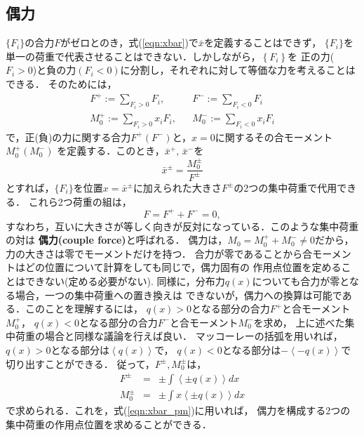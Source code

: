 \documentclass[10pt,a4j]{jbook}
\begin{document}
\subsection{偶力}
$\{F_i\}$の合力$F$がゼロとのき，式(\ref{eqn:xbar})で$\bar x$を定義することはできず，
$\{F_i\}$を単一の荷重で代表させることはできない．しかしながら，$\left\{ F_i \right\}$を
正の力($F_i >0$)と負の力$(F_i<0)$に分割し，それぞれに対して等価な力を考えることはできる．
そのためには，
\begin{eqnarray}
	F^+ := \sum _{ F_i > 0 } F_i, & & F^- := \sum _{F_i < 0 } F_i 
	\label{eqn:F_pm}
	\\
	M_0^+ := \sum _{F_i > 0 } x_i F_i, & & M_0^- := \sum _{F_i < 0 } x_iF_i 
	\label{eqn:M_pm}
\end{eqnarray}
で，正(負)の力に関する合力$F^+(F^-)$と，$x=0$に関するその合モーメント$M_0^{+}(M_0^{-})$
を定義する．このとき，$\bar x^+,\, \bar x^-$を
\begin{equation}
	\bar x ^\pm = \frac{M_0^\pm }{F ^\pm} 
	\label{eqn:xbar_pm}
\end{equation}
とすれば，$\{F_i\}$を位置$x=\bar x ^\pm$に加えられた大きさ$F^\pm$の2つの集中荷重で代用できる．
これら2つ荷重の組は，
\begin{equation}
	F=F^++F^-=0,
\end{equation}
すなわち，互いに大きさが等しく向きが反対になっている．このような集中荷重の対は
{\bf 偶力(couple force)}と呼ばれる．
偶力は，$M_0=M_0^+ + M_0^-\neq 0$だから，力の大きさは零でモーメントだけを持つ．
合力が零であることから合モーメントはどの位置について計算をしても同じで，偶力固有の
作用点位置を定めることはできない(定める必要がない). 
同様に，分布力$q(x)$についても合力が零となる場合，一つの集中荷重への置き換えは
できないが，偶力への換算は可能である．このことを理解するには，
$q(x)>0$となる部分の合力$F^+$と合モーメント$M^+_0$，
$q(x)<0$となる部分の合力$F^-$と合モーメント$M^-_0$を求め，
上に述べた集中荷重の場合と同様な議論を行えば良い．
マッコーレーの括弧を用いれば， $q(x)>0$となる部分は$\left<q(x)\right>$で，
$q(x)<0$となる部分は$-\left<-q(x)\right>$で切り出すことができる．
従って，$F^\pm, M^\pm_0$は，
\begin{eqnarray}
	F^\pm &=& \pm \int \left< \pm q(x) \right>dx
	\label{eqn:Fpm_q} \\
	M_0^\pm &=& \pm \int x\left< \pm q(x) \right>dx
	\label{eqn:Mpm_q}
\end{eqnarray}
で求められる．これを，式(\ref{eqn:xbar_pm})に用いれば，
偶力を構成する2つの集中荷重の作用点位置を求めることができる．
\end{document}

